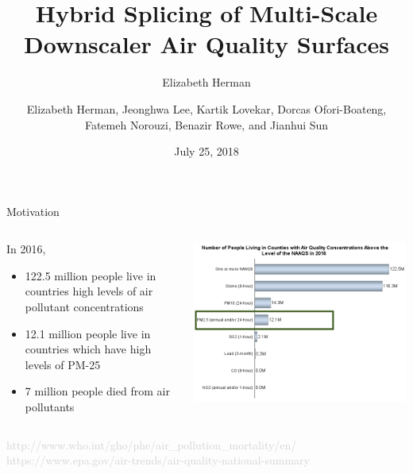 \documentclass{beamer}
\title[Hybrid Splicing]{Hybrid Splicing of Multi-Scale Downscaler Air Quality Surfaces}
\author{Elizabeth Herman}
\author[H, L, L, O, N, R, S ]{Elizabeth Herman, Jeonghwa Lee, Kartik Lovekar, Dorcas Ofori-Boateng, Fatemeh Norouzi, Benazir Rowe, and Jianhui Sun}
\institute[IMSM 2018]{Industrial Math/Stat Modeling Workshop 2018}
\date{July 25, 2018}
\begin{document}
\begin{frame}
\titlepage 
\end{frame}



\begin{frame}{Motivation}

\begin{columns}
\begin{column}{4cm}
In 2016, 
\begin{itemize}
\item 122.5 million people live in countries high levels of air pollutant concentrations
\item 12.1 million people live in countries which have high levels of PM-25
\item 7 million people died from air pollutants
\end{itemize}

\end{column}
\begin{column}{7cm}
\vspace{-3mm}
\begin{center}
\includegraphics[width=1.0\textwidth]{pollution.png}
\end{center}

\end{column}
\end{columns}
\begin{center}
\small{\textcolor{lightgray}{http://www.who.int/gho/phe/air\_pollution\_mortality/en/}}
\\\small{\textcolor{lightgray}{https://www.epa.gov/air-trends/air-quality-national-summary}}
\end{center}
\end{frame}
\end{document}
